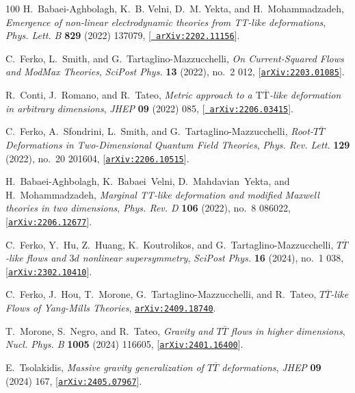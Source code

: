\documentclass[11pt]{article}
\begin{document}
\begin{thebibliography}{100}
H.~Babaei-Aghbolagh, K.~B. Velni, D.~M. Yekta, and H.~Mohammadzadeh, {\it
  {Emergence of non-linear electrodynamic theories from
  TT\textasciimacron{}-like deformations}},  {\em Phys. Lett. B} {\bf 829}
  (2022) 137079, [\href{http://arxiv.org/abs/2202.11156}{{\tt
  arXiv:2202.11156}}].

C.~Ferko, L.~Smith, and G.~Tartaglino-Mazzucchelli, {\it {On Current-Squared
  Flows and ModMax Theories}},  {\em SciPost Phys.} {\bf 13} (2022), no.~2 012,
  [\href{http://arxiv.org/abs/2203.01085}{{\tt arXiv:2203.01085}}].

R.~Conti, J.~Romano, and R.~Tateo, {\it {Metric approach to a $
  \mathrm{T}\overline{\mathrm{T}} $-like deformation in arbitrary dimensions}},
   {\em JHEP} {\bf 09} (2022) 085, [\href{http://arxiv.org/abs/2206.03415}{{\tt
  arXiv:2206.03415}}].

C.~Ferko, A.~Sfondrini, L.~Smith, and G.~Tartaglino-Mazzucchelli, {\it {Root-$T
  \bar T$ Deformations in Two-Dimensional Quantum Field Theories}},  {\em Phys.
  Rev. Lett.} {\bf 129} (2022), no.~20 201604,
  [\href{http://arxiv.org/abs/2206.10515}{{\tt arXiv:2206.10515}}].

H.~Babaei-Aghbolagh, K.~Babaei~Velni, D.~Mahdavian~Yekta, and H.~Mohammadzadeh,
  {\it {Marginal TT\textasciimacron{}-like deformation and modified Maxwell
  theories in two dimensions}},  {\em Phys. Rev. D} {\bf 106} (2022), no.~8
  086022, [\href{http://arxiv.org/abs/2206.12677}{{\tt arXiv:2206.12677}}].

C.~Ferko, Y.~Hu, Z.~Huang, K.~Koutrolikos, and G.~Tartaglino-Mazzucchelli, {\it
  {$T \overline{T}$-like flows and $3d$ nonlinear supersymmetry}},  {\em
  SciPost Phys.} {\bf 16} (2024), no.~1 038,
  [\href{http://arxiv.org/abs/2302.10410}{{\tt arXiv:2302.10410}}].

C.~Ferko, J.~Hou, T.~Morone, G.~Tartaglino-Mazzucchelli, and R.~Tateo, {\it
  {${T\overline{T}}$-like Flows of Yang-Mills Theories}},
  \href{http://arxiv.org/abs/2409.18740}{{\tt arXiv:2409.18740}}.

T.~Morone, S.~Negro, and R.~Tateo, {\it {Gravity and $T\bar{T}$ flows in higher
  dimensions}},  {\em Nucl. Phys. B} {\bf 1005} (2024) 116605,
  [\href{http://arxiv.org/abs/2401.16400}{{\tt arXiv:2401.16400}}].

E.~Tsolakidis, {\it {Massive gravity generalization of $ T\overline{T} $
  deformations}},  {\em JHEP} {\bf 09} (2024) 167,
  [\href{http://arxiv.org/abs/2405.07967}{{\tt arXiv:2405.07967}}].


\end{thebibliography}
\end{document}
